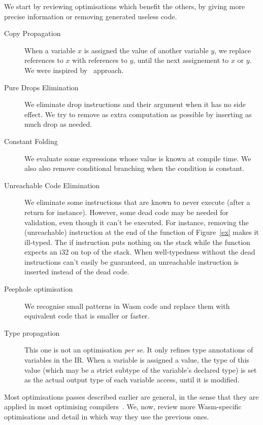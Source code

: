 \documentclass[a4paper,11pt]{article}
\begin{document}
We start by reviewing optimisations which benefit the others, by giving more
precise information or removing generated useless code.

\begin{description}
  \item[Copy Propagation] When a variable $x$ is assigned the value of another
    variable $y$, we replace references to $x$ with references to $y$, until the
    next assignement to $x$ or $y$. We were inspired
    by~\cite[Section~12.5]{muchnick1997advanced} approach.
  \item[Pure Drops Elimination] We eliminate \textsf{drop} instructions and
    their argument when it has no side effect. We try to remove as extra
    computation as possible by inserting as much \textsf{drop} as needed.
  \item[Constant Folding] We evaluate some expressions whose value is known at
    compile time. We also also remove conditional branching when the condition
    is constant.
  \item[Unreachable Code Elimination] We eliminate some instructions that are
    known to never execute (after a \textsf{return} for instance). However, some
    dead code may be needed for validation, even though it can't be executed.
    For instance, removing the \textsf{(unreachable)} instruction at the end of
    the function of Figure~\ref{ex} makes it ill-typed. The \textsf{if}
    instruction puts nothing on the stack while the function expects an
    \textsf{i32} on top of the stack. When well-typedness without the dead
    instructions can't easily be guaranteed, an \textsf{unreachable} instruction
    is inserted instead of the dead code.
  \item[Peephole optimisation] We recognise small patterns in Wasm code and
    replace them with equivalent code that is smaller or faster.
  \item[Type propagation] This one is not an optimisation \emph{per se}. It only
    refines type annotations of variables in the IR. When a variable is assigned
    a value, the type of this value (which may be a strict subtype of the
    variable's declared type) is set as the actual output type of each variable
    access, until it is modified.
\end{description}

Most optimisations passes described earlier are general, in the sense that they
are applied in most optimising compilers~\cite{muchnick1997advanced}. We, now,
review more Wasm-specific optimisations and detail in which way they use the
previous ones.
\end{document}
